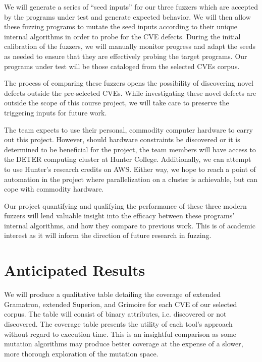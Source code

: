\documentclass[12pt]{diazessay}
\begin{document}
We will generate a series of ``seed inputs'' for our three fuzzers which are accepted by the programs under test and generate expected behavior.
We will then allow these fuzzing programs to mutate the seed inputs\cite{Seed} according to their unique internal algorithms in order to probe for the CVE defects.
During the initial calibration of the fuzzers, we will manually monitor progress and adapt the seeds as needed to ensure that they are effectively probing the target programs.
Our programs under test will be those cataloged from the selected CVEs corpus.

The process of comparing these fuzzers opens the possibility of discovering novel defects outside the pre-selected CVEs.
While investigating these novel defects are outside the scope of this course project, we will take care to preserve the triggering inputs for future work.

The team expects to use their personal, commodity computer hardware to carry out this project.
However, should hardware constraints be discovered or it is determined to be beneficial for the project, the team members will have access to the DETER computing cluster at Hunter College.
Additionally, we can attempt to use Hunter's research credits on AWS.
Either way, we hope to reach a point of automation in the project where parallelization on a cluster is achievable, but can cope with commodity hardware.

Our project quantifying and qualifying the performance of these three modern fuzzers will lend valuable insight into the efficacy between these programs' internal algorithms, and how they compare to previous work.
This is of academic interest as it will inform the direction of future research in fuzzing.


\vspace{-0.25cm}
\section*{Anticipated Results}
\label{results}
\vspace{-0.25cm}

We will produce a qualitative table detailing the coverage of extended Gramatron, extended Superion, and Grimoire for each CVE of our selected corpus.
The table will consist of binary attributes, i.e. discovered or not discovered.
The coverage table presents the utility of each tool's approach without regard to execution time.
This is an insightful comparison as some mutation algorithms may produce better coverage at the expense of a slower, more thorough exploration of the mutation space.
\end{document}
